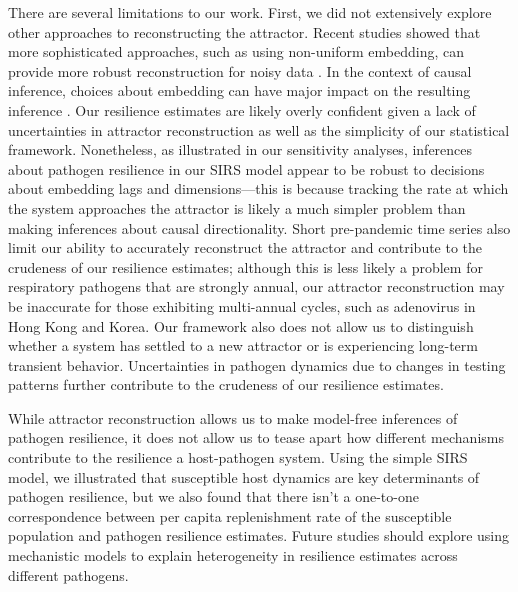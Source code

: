 \documentclass[12pt]{article}
\begin{document}
There are several limitations to our work.
First, we did not extensively explore other approaches to reconstructing the attractor.
Recent studies showed that more sophisticated approaches, such as using non-uniform embedding, can provide more robust reconstruction for noisy data \citep{tan2023selecting}.
In the context of causal inference, choices about embedding can have major impact on the resulting inference \citep{cobey2016limits}.
Our resilience estimates are likely overly confident given a lack of uncertainties in attractor reconstruction as well as the simplicity of our statistical framework.
Nonetheless, as illustrated in our sensitivity analyses, inferences about pathogen resilience in our SIRS model appear to be robust to decisions about embedding lags and dimensions---this is because tracking the rate at which the system approaches the attractor is likely a much simpler problem than making inferences about causal directionality.
Short pre-pandemic time series also limit our ability to accurately reconstruct the attractor and contribute to the crudeness of our resilience estimates;
although this is less likely a problem for respiratory pathogens that are strongly annual, our attractor reconstruction may be inaccurate for those exhibiting multi-annual cycles, such as adenovirus in Hong Kong and Korea.
Our framework also does not allow us to distinguish whether a system has settled to a new attractor or is experiencing long-term transient behavior.
Uncertainties in pathogen dynamics due to changes in testing patterns further contribute to the crudeness of our resilience estimates.

While attractor reconstruction allows us to make model-free inferences of pathogen resilience, it does not allow us to tease apart how different mechanisms contribute to the resilience a host-pathogen system.
Using the simple SIRS model, we illustrated that susceptible host dynamics are key determinants of pathogen resilience, but we also found that there isn't a one-to-one correspondence between per capita replenishment rate of the susceptible population and pathogen resilience estimates.
Future studies should explore using mechanistic models to explain heterogeneity in resilience estimates across different pathogens.
\end{document}

